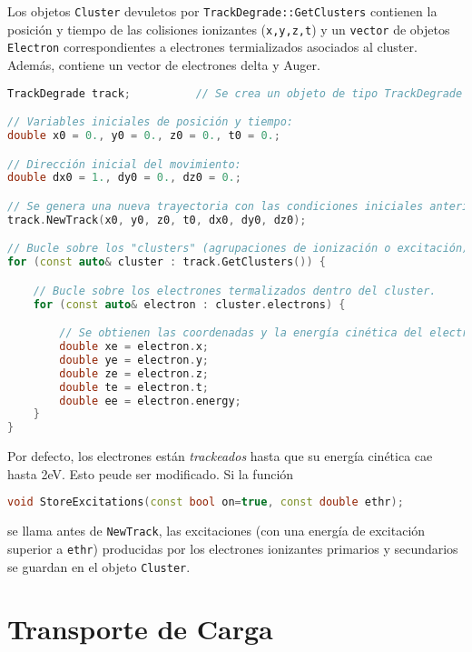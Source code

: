 Los objetos \texttt{Cluster} devuletos por \texttt{TrackDegrade::GetClusters} contienen la posición y tiempo de las colisiones ionizantes (\texttt{x,y,z,t}) y un \texttt{vector} de objetos \texttt{Electron} correspondientes a electrones termializados asociados al cluster. Además, contiene un vector de electrones delta y Auger. \\


\begin{lstlisting}[language=C++,style=c++]
TrackDegrade track;          // Se crea un objeto de tipo TrackDegrade 

// Variables iniciales de posición y tiempo:
double x0 = 0., y0 = 0., z0 = 0., t0 = 0.;

// Dirección inicial del movimiento:
double dx0 = 1., dy0 = 0., dz0 = 0.;

// Se genera una nueva trayectoria con las condiciones iniciales anteriores:
track.NewTrack(x0, y0, z0, t0, dx0, dy0, dz0);

// Bucle sobre los "clusters" (agrupaciones de ionización o excitación) a lo largo de la trayectoria.
for (const auto& cluster : track.GetClusters()) {

    // Bucle sobre los electrones termalizados dentro del cluster.
    for (const auto& electron : cluster.electrons) {

        // Se obtienen las coordenadas y la energía cinética del electrón.
        double xe = electron.x;
        double ye = electron.y;
        double ze = electron.z;
        double te = electron.t;
        double ee = electron.energy;
    }
}
\end{lstlisting}
\vspace*{0.6em}
Por defecto, los electrones están \textit{trackeados} hasta que su energía cinética cae hasta 2eV. Esto peude ser modificado.  Si la función \\

\begin{lstlisting}[language=C++,style=c++]
void StoreExcitations(const bool on=true, const double ethr);
\end{lstlisting}
\vspace*{0.6em}
se llama antes de \texttt{NewTrack}, las excitaciones (con una energía de excitación superior a \texttt{ethr}) producidas por los electrones ionizantes primarios y secundarios se guardan en el objeto \texttt{Cluster}.

\section{Transporte de Carga}

